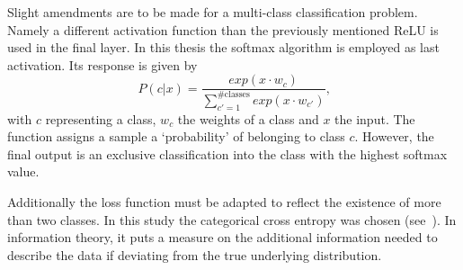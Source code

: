 
Slight amendments are to be made for a multi-class classification problem. Namely a different activation function than the previously mentioned ReLU is used in the final layer. In this thesis the softmax algorithm is employed as last activation. Its response is given by
\begin{equation*}
	P(c | x) = \frac{exp(x \cdot w_c)}{\sum \limits_{c' = 1}^{\#\text{classes}} exp(x \cdot w_{c'})}
	\text{,}
\end{equation*}
with $c$ representing a class, $w_c$ the weights of a class and $x$ the input. The function assigns a sample a `probability' of belonging to class $c$. However, the final output is an exclusive classification into the class with the highest softmax value.

Additionally the loss function must be adapted to reflect the existence of more than two classes. In this study the categorical cross entropy was chosen (see~\cite{MachineLearning:LinearClassification}). In information theory, it puts a measure on the additional information needed to describe the data if deviating from the true underlying distribution.

